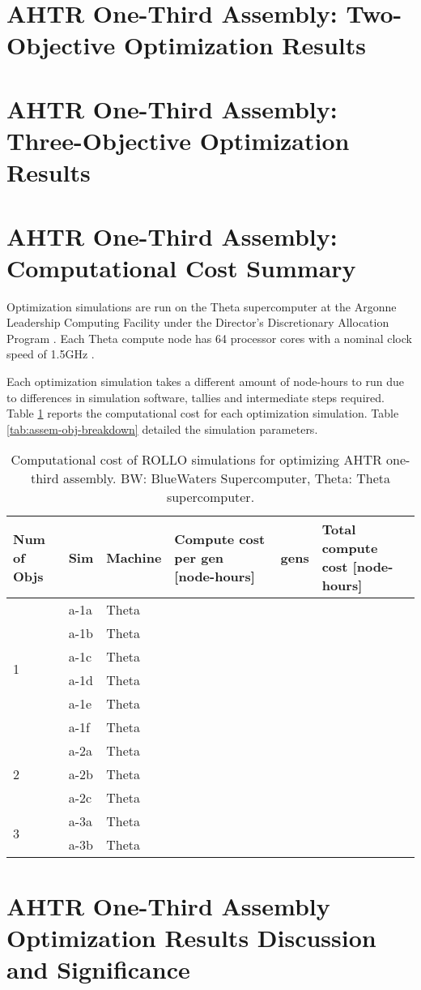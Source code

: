\section{AHTR One-Third Assembly: Two-Objective Optimization Results}

\section{AHTR One-Third Assembly: Three-Objective Optimization Results}

\section{AHTR One-Third Assembly: Computational Cost Summary}
\label{sec:assem-compute-cost}
Optimization simulations are run on the Theta supercomputer at the Argonne Leadership 
Computing Facility under the Director's Discretionary Allocation Program 
\cite{noauthor_argonne_2022}. 
Each Theta compute node has 64 processor cores with a nominal clock speed of 
1.5GHz \cite{noauthor_argonne_2022}.  

Each optimization simulation takes a different amount of node-hours to run due to 
differences in simulation software, tallies and intermediate steps required. 
Table \ref{tab:assem-compute-cost} reports the computational cost for each optimization 
simulation. 
Table \ref{tab:assem-obj-breakdown} detailed the simulation parameters.
\begin{table}[htbp!]
    \centering
    \onehalfspacing
    \caption{Computational cost of \acrfull{ROLLO} simulations for optimizing 
    \acrfull{AHTR} one-third assembly. BW: BlueWaters Supercomputer, Theta: Theta 
    supercomputer.}
	\label{tab:assem-compute-cost}
    \footnotesize
    \begin{tabular}{p{1.4cm}|p{1cm}lp{4cm}lp{4cm}}
    \hline 
    \textbf{Num of Objs} & \textbf{Sim} & \textbf{Machine} & 
    \textbf{Compute cost per gen [node-hours]} &\textbf{gens} & 
    \textbf{Total compute cost [node-hours]} \\
    \hline
    \multirow{6}{2cm}{1} 
    & a-1a & Theta &  &  &  \\
    & a-1b & Theta &  &  &  \\
    & a-1c & Theta &  &  &  \\
    & a-1d & Theta &  &  &  \\
    & a-1e & Theta &  &  &  \\
    & a-1f & Theta &  &  &  \\
    \hline
    \multirow{3}{2cm}{2}
    & a-2a & Theta &  &  &  \\
    & a-2b & Theta &  &  &  \\
    & a-2c & Theta &  &  &  \\
    \hline
    \multirow{2}{2cm}{3}
    & a-3a & Theta &  &  &  \\
    & a-3b & Theta &  &  &  \\
    \hline
    \end{tabular}
\end{table}

\section{AHTR One-Third Assembly Optimization Results Discussion and Significance}
\label{sec:assem-discussion}